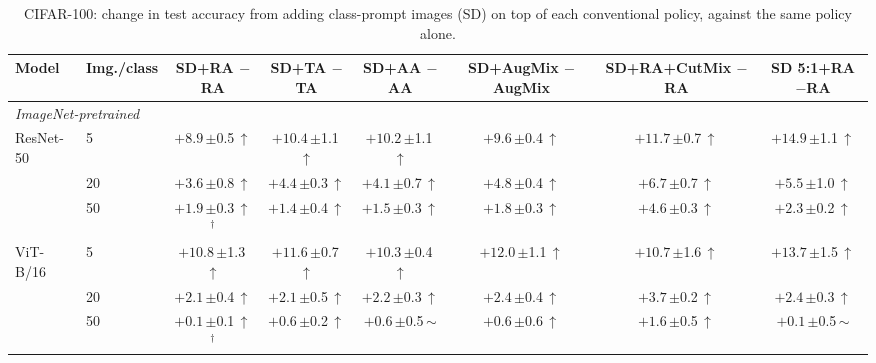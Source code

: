 \begin{table}[htbp]
\centering
\footnotesize
\setlength{\tabcolsep}{4pt}
\caption{CIFAR-100: change in test accuracy from adding class-prompt images (SD) on top of each conventional policy, against the same policy alone.}
\label{tab:paper-stacked}
\begin{tabular}{llcccccc}
\toprule
Model & Img./class & \shortstack{SD+RA\\$-$RA} & \shortstack{SD+TA\\$-$TA} & \shortstack{SD+AA\\$-$AA} & \shortstack{SD+AugMix\\$-$AugMix} & \shortstack{SD+RA+CutMix\\$-$RA} & \shortstack{SD 5:1+RA\\$-$RA} \\
\midrule
\multicolumn{8}{l}{\textit{ImageNet-pretrained}} \\
ResNet-50 & 5 & $+8.9$\,{\scriptsize$\pm$0.5}\,$\uparrow$ & $+10.4$\,{\scriptsize$\pm$1.1}\,$\uparrow$ & $+10.2$\,{\scriptsize$\pm$1.1}\,$\uparrow$ & $+9.6$\,{\scriptsize$\pm$0.4}\,$\uparrow$ & $+11.7$\,{\scriptsize$\pm$0.7}\,$\uparrow$ & $+14.9$\,{\scriptsize$\pm$1.1}\,$\uparrow$ \\
 & 20 & $+3.6$\,{\scriptsize$\pm$0.8}\,$\uparrow$ & $+4.4$\,{\scriptsize$\pm$0.3}\,$\uparrow$ & $+4.1$\,{\scriptsize$\pm$0.7}\,$\uparrow$ & $+4.8$\,{\scriptsize$\pm$0.4}\,$\uparrow$ & $+6.7$\,{\scriptsize$\pm$0.7}\,$\uparrow$ & $+5.5$\,{\scriptsize$\pm$1.0}\,$\uparrow$ \\
 & 50 & $+1.9$\,{\scriptsize$\pm$0.3}\,$\uparrow$$^\dagger$ & $+1.4$\,{\scriptsize$\pm$0.4}\,$\uparrow$ & $+1.5$\,{\scriptsize$\pm$0.3}\,$\uparrow$ & $+1.8$\,{\scriptsize$\pm$0.3}\,$\uparrow$ & $+4.6$\,{\scriptsize$\pm$0.3}\,$\uparrow$ & $+2.3$\,{\scriptsize$\pm$0.2}\,$\uparrow$ \\
\addlinespace[2pt]
ViT-B/16 & 5 & $+10.8$\,{\scriptsize$\pm$1.3}\,$\uparrow$ & $+11.6$\,{\scriptsize$\pm$0.7}\,$\uparrow$ & $+10.3$\,{\scriptsize$\pm$0.4}\,$\uparrow$ & $+12.0$\,{\scriptsize$\pm$1.1}\,$\uparrow$ & $+10.7$\,{\scriptsize$\pm$1.6}\,$\uparrow$ & $+13.7$\,{\scriptsize$\pm$1.5}\,$\uparrow$ \\
 & 20 & $+2.1$\,{\scriptsize$\pm$0.4}\,$\uparrow$ & $+2.1$\,{\scriptsize$\pm$0.5}\,$\uparrow$ & $+2.2$\,{\scriptsize$\pm$0.3}\,$\uparrow$ & $+2.4$\,{\scriptsize$\pm$0.4}\,$\uparrow$ & $+3.7$\,{\scriptsize$\pm$0.2}\,$\uparrow$ & $+2.4$\,{\scriptsize$\pm$0.3}\,$\uparrow$ \\
 & 50 & $+0.1$\,{\scriptsize$\pm$0.1}\,$\uparrow$$^\dagger$ & $+0.6$\,{\scriptsize$\pm$0.2}\,$\uparrow$ & $+0.6$\,{\scriptsize$\pm$0.5}\,$\sim$ & $+0.6$\,{\scriptsize$\pm$0.6}\,$\uparrow$ & $+1.6$\,{\scriptsize$\pm$0.5}\,$\uparrow$ & $+0.1$\,{\scriptsize$\pm$0.5}\,$\sim$ \\

\end{tabular}
\end{table}
